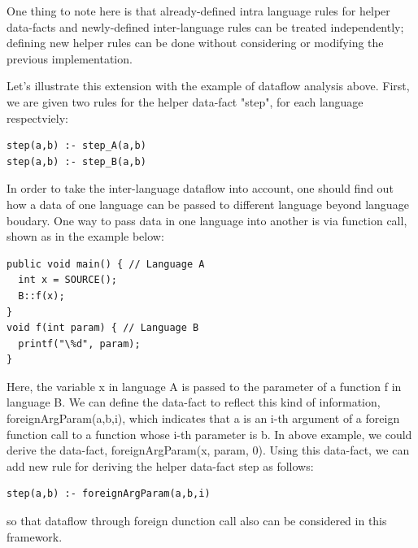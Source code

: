 One thing to note here is that already-defined intra language rules for helper
data-facts and newly-defined inter-language rules can be treated independently;
defining new helper rules can be done without considering or modifying the 
previous implementation.

Let's illustrate this extension with the example of dataflow analysis above.
First, we are given two rules for the helper data-fact "step", for each language
respectviely:
\begin{lstlisting}[style=myDatalog,xleftmargin=2.5em]
step(a,b) :- step_A(a,b)
step(a,b) :- step_B(a,b)
\end{lstlisting}
In order to take the inter-language dataflow into account, one should find out
how a data of one language can be passed to different language beyond language
boudary.  One way to pass data in one language into another is via function
call, shown as in the example below:

\begin{lstlisting}[style=java,xleftmargin=2.5em]
public void main() { // Language A
  int x = SOURCE();
  B::f(x);
}
void f(int param) { // Language B
  printf("\%d", param);
}
\end{lstlisting}

Here, the variable x in language A is passed to the parameter of a function f
in language B. We can define the data-fact to reflect this kind of information,
foreignArgParam(a,b,i), which indicates that a is an i-th argument of a foreign
function call to a function whose i-th parameter is b. In above example, we
could derive the data-fact, foreignArgParam(x, param, 0). Using this data-fact,
we can add new rule for deriving the helper data-fact step as follows:
\begin{lstlisting}[style=myDatalog,xleftmargin=2.5em]
step(a,b) :- foreignArgParam(a,b,i)
\end{lstlisting}
so that dataflow through foreign dunction call also can be considered in this
framework.
